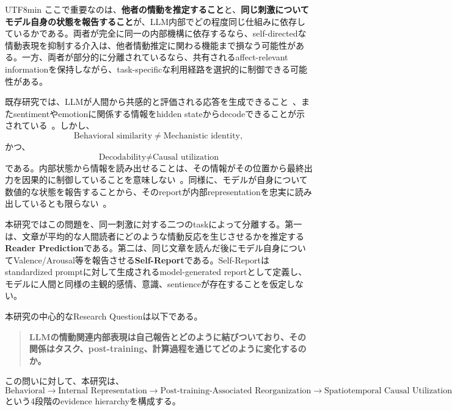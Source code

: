 \documentclass{article} %
\begin{document}
\begin{CJK*}{UTF8}{min}
ここで重要なのは、\textbf{他者の情動を推定すること}と、\textbf{同じ刺激についてモデル自身の状態を報告すること}が、LLM内部でどの程度同じ仕組みに依存しているかである。両者が完全に同一の内部機構に依存するなら、self-directedな情動表現を抑制する介入は、他者情動推定に関わる機能まで損なう可能性がある。一方、両者が部分的に分離されているなら、共有されるaffect-relevant informationを保持しながら、task-specificな利用経路を選択的に制御できる可能性がある。

既存研究では、LLMが人間から共感的と評価される応答を生成できること~\citep{ayers2023comparing,elyoseph2023chatgpt,huang2023emotionally,yu2025can}、またsentimentやemotionに関係する情報をhidden stateからdecodeできることが示されている~\citep{di2025llamas,tak2025mechanistic,wu2026decoding}。しかし、
\[
\text{Behavioral similarity}
\neq
\text{Mechanistic identity},
\]
かつ、
\[
\text{Decodability}
\neq
\text{Causal utilization}
\]
である。内部状態から情報を読み出せることは、その情報がその位置から最終出力を因果的に制御していることを意味しない~\citep{hewitt2019designing}。同様に、モデルが自身について数値的な状態を報告することから、そのreportが内部representationを忠実に読み出しているとも限らない~\citep{burns2022discovering,turpin2023language}。

本研究ではこの問題を、同一刺激に対する二つのtaskによって分離する。第一は、文章が平均的な人間読者にどのような情動反応を生じさせるかを推定する\textbf{Reader Prediction}である。第二は、同じ文章を読んだ後にモデル自身についてValence/Arousal等を報告させる\textbf{Self-Report}である。Self-Reportはstandardized promptに対して生成されるmodel-generated reportとして定義し、モデルに人間と同様の主観的感情、意識、sentienceが存在することを仮定しない。

本研究の中心的なResearch Questionは以下である。

\begin{quote}
\textbf{LLMの情動関連内部表現は自己報告とどのように結びついており、その関係はタスク、post-training、計算過程を通じてどのように変化するのか。}
\end{quote}

この問いに対して、本研究は、
\[
\text{Behavioral}
\rightarrow
\text{Internal Representation}
\rightarrow
\text{Post-training-Associated Reorganization}
\rightarrow
\text{Spatiotemporal Causal Utilization}
\]
という4段階のevidence hierarchyを構成する。


\end{CJK*}
\end{document}
